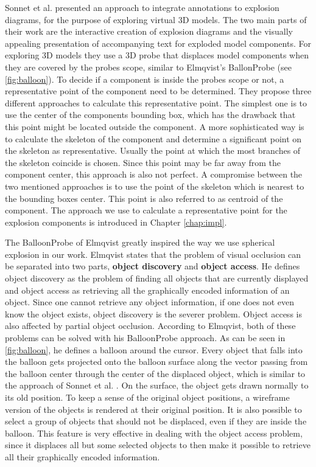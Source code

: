 \documentclass[draft,final]{vutinfth} %
\begin{document}
\par Sonnet et al. \cite{sonnet2004integrating} presented an approach to integrate annotations to explosion diagrams, for the purpose of exploring virtual 3D models. The two main parts of their work are the interactive creation of explosion diagrams and the visually appealing presentation of accompanying text for exploded model components. For exploring 3D models they use a 3D probe that displaces model components when they are covered by the probes scope, similar to Elmqvist's BallonProbe \cite{elmqvist2005balloonprobe} (see \autoref{fig:balloon}). To decide if a component is inside the probes scope or not, a representative point of the component need to be determined. They propose three different approaches to calculate this representative point. The simplest one is to use the center of the components bounding box, which has the drawback that this point might be located outside the component. A more sophisticated way is to calculate the skeleton of the component and determine a significant point on the skeleton as representative. Usually the point at which the most branches of the skeleton coincide is chosen. Since this point may be far away from the component center, this approach is also not perfect. A compromise between the two mentioned approaches is to use the point of the skeleton which is nearest to the bounding boxes center. This point is also referred to as centroid of the component. The approach we use to calculate a representative point for the explosion components is introduced in Chapter \ref{chap:impl}.

\par The BalloonProbe of Elmqvist \cite{elmqvist2005balloonprobe} greatly inspired the way we use spherical explosion in our work. Elmqvist states that the problem of visual occlusion can be separated into two parts, \textbf{object discovery} and \textbf{object access}. He defines object discovery as the problem of finding all objects that are currently displayed and object access as retrieving all the graphically encoded information of an object. Since one cannot retrieve any object information, if one does not even know the object exists, object discovery is the severer problem. Object access is also affected by partial object occlusion. According to Elmqvist, both of these problems can be solved with his BalloonProbe approach. As can be seen in \autoref{fig:balloon}, he defines a balloon around the cursor. Every object that falls into the balloon gets projected onto the balloon surface along the vector passing from the balloon center through the center of the displaced object, which is similar to the approach of Sonnet et al. \cite{sonnet2004integrating}. On the surface, the object gets drawn normally to its old position. To keep a sense of the original object positions, a wireframe version of the objects is rendered at their original position. It is also possible to select a group of objects that should not be displaced, even if they are inside the balloon. This feature is very effective in dealing with the object access problem, since it displaces all but some selected objects to then make it possible to retrieve all their graphically encoded information.
\end{document}
